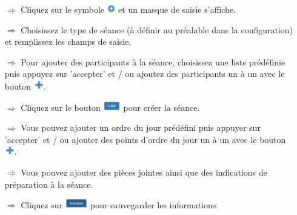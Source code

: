 \documentclass{article}
\begin{document}
\begin{multicols}{2}

\begin{tcolorbox}[colback=blue!5,colframe=blue!40!black,title=Préparer une invitation à une séance]
\begin{itemize}
  \item[$\Longrightarrow$] Cliquez sur le symbole \includegraphics[height=10pt]{Icons/Plussymbol.jpg} et un masque de saisie s'affiche.
  \item[$\Longrightarrow$] Choisissez le type de séance (à définir au préalable dans la configuration) et remplissez les champs de saisie.
	\item[$\Longrightarrow$] Pour ajouter des participants à la séance, choisissez une liste prédéfinie puis appuyez sur 'accepter' et / ou ajoutez des participants un à un avec le bouton \includegraphics[height=12pt]{Icons/Pluszeichen.jpg}.
  \item[$\Longrightarrow$] Cliquez sur le bouton \includegraphics[height=12pt]{Icons/B_Erstellen.jpg} pour créer la séance. 
	\item[$\Longrightarrow$] Vous pouvez ajouter un ordre du jour prédéfini puis appuyer sur 'accepter' et / ou ajouter des points d'ordre du jour un à un avec le bouton \includegraphics[height=12pt]{Icons/Pluszeichen.jpg}.
  \item[$\Longrightarrow$] Vous pouvez ajouter des pièces jointes ainsi que des indications de préparation à la séance.					
	\item[$\Longrightarrow$] Cliquez sur \includegraphics[height=12pt]{Icons/B_Uebernehmen.jpg} pour sauvegarder les informations.
\end{itemize}
\end{tcolorbox}





\end{multicols}
\end{document}

